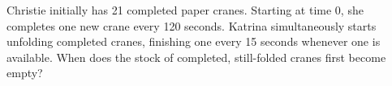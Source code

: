 Christie initially has 21 completed paper cranes. Starting at time 0, she completes one new crane every 120 seconds. Katrina simultaneously starts unfolding completed cranes, finishing one every 15 seconds whenever one is available. When does the stock of completed, still-folded cranes first become empty?
